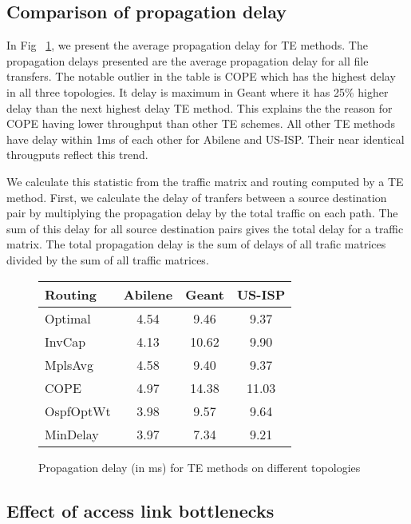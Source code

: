 \subsection{Comparison of propagation delay}

In Fig ~\ref{fig:prop_delay_all}, we present the average propagation delay for TE methods. The propagation delays presented are the average propagation delay for all file transfers.  The notable outlier in the table is COPE which has the highest delay in all three topologies. It delay is maximum in Geant where it has 25\% higher delay than the next highest delay TE method. This explains the the reason for COPE having lower throughput than other TE schemes. All other TE methods have delay within 1ms of each other for Abilene and US-ISP. Their near identical througputs reflect this trend.

We calculate this statistic from the traffic matrix and routing computed by a TE method. First, we calculate the delay of tranfers between a source destination pair by multiplying the propagation delay by the total traffic on each path. The sum of this delay for all source destination pairs gives the total delay for a traffic matrix. The total propagation delay is the sum of delays of all trafic matrices divided by the sum of all traffic matrices.


\begin{figure}
\begin{center}
  \begin{tabular}{| l | c | c | c | }
    \hline
Routing & Abilene & Geant & US-ISP \\ \hline \hline
Optimal &  4.54 &	9.46 & 9.37\\ \hline
InvCap & 4.13 &10.62 & 9.90 \\ \hline
MplsAvg & 4.58 & 9.40 & 9.37\\ \hline
COPE &4.97 & 14.38 & 11.03\\ \hline
OspfOptWt & 3.98 & 9.57 & 9.64\\ \hline
MinDelay & 3.97 & 7.34 & 9.21\\ \hline
  \end{tabular}
\caption{Propagation delay (in ms) for TE methods on different topologies}
\end{center}
\label{fig:prop_delay_all}
\end{figure}

\subsection{Effect of access link bottlenecks}

